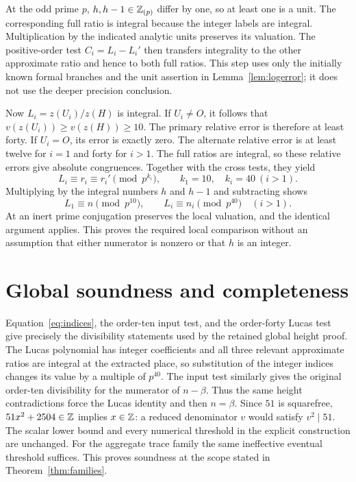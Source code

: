 \documentclass[11pt,a4paper]{article}
\theoremstyle{remark}\newtheorem{remark}[theorem]{Remark}
\begin{document}
At the odd prime $p$, $h,h-1\in\mathbb Z_{(p)}$ differ by one, so at least
one is a unit. The corresponding full ratio is integral because the
integer labels are integral. Multiplication by the indicated analytic
units preserves its valuation. The positive-order test $C_i=L_i-L_i'$
then transfers integrality to the other approximate ratio and hence
to both full ratios. This step uses only the initially known formal
branches and the unit assertion in Lemma~\ref{lem:logerror}; it does
not use the deeper precision conclusion.

Now $L_i=z(U_i)/z(H)$ is integral. If $U_i\ne O$, it follows that
$v(z(U_i))\ge v(z(H))\ge10$. The primary relative error is therefore
at least forty. If $U_i=O$, its error is exactly zero. The alternate
relative error is at least twelve for $i=1$ and forty for $i>1$.
The full ratios are integral, so these relative errors give absolute
congruences. Together with the cross tests, they yield
\[
 L_i\equiv r_i\equiv r_i'\pmod{p^{k_i}},
 \qquad k_1=10,\quad k_i=40\ (i>1).
\]
Multiplying by the integral numbers $h$ and $h-1$ and subtracting
shows
\begin{equation}\label{eq:indices}
           L_1\equiv n\pmod{p^{10}},\qquad
           L_i\equiv n_i\pmod{p^{40}}\quad(i>1).
\end{equation}
At an inert prime conjugation preserves the local valuation, and
the identical argument applies. This proves the required local
comparison without an assumption that either numerator is nonzero
or that $h$ is an integer.

\section{Global soundness and completeness}
Equation~\eqref{eq:indices}, the order-ten input test, and the
order-forty Lucas test give precisely the divisibility statements
used by the retained global height proof. The Lucas polynomial has
integer coefficients and all three relevant approximate ratios are
integral at the extracted place, so substitution of the integer
indices changes its value by a multiple of $p^{40}$. The input test
similarly gives the original order-ten divisibility for the numerator
of $n-\beta$. Thus the same height contradictions force the Lucas
identity and then $n=\beta$. Since $51$ is squarefree,
$51x^2+2504\in\mathbb Z$ implies $x\in\mathbb Z$: a reduced denominator $v$ would
satisfy $v^2\mid51$. The scalar lower bound and every numerical
threshold in the explicit construction are unchanged. For the
aggregate trace family the same ineffective eventual threshold
suffices. This proves soundness at the scope stated in
Theorem~\ref{thm:families}.
\end{document}
